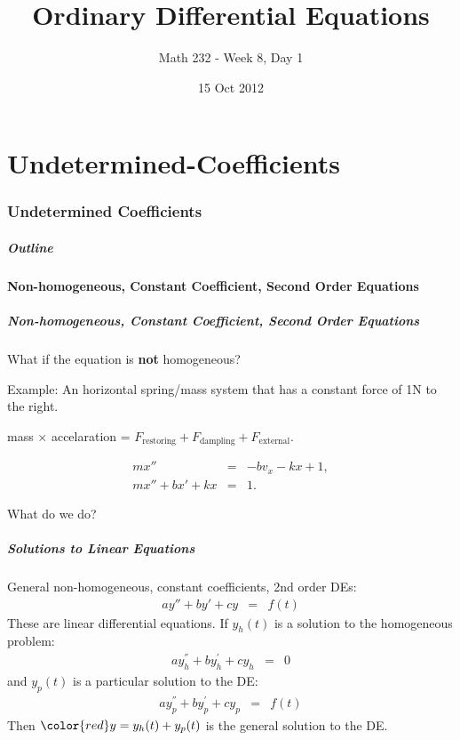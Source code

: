 \part{Undetermined-Coefficients}
\section{Undetermined Coefficients}

\title{Ordinary Differential Equations}
\subtitle{Math 232 - Week 8, Day 1}
\date{15 Oct 2012}

\begin{frame}
  \titlepage
\end{frame}

\begin{frame}
  \frametitle{Outline}
\end{frame}


\subsection{Non-homogeneous, Constant Coefficient, Second Order Equations}


\begin{frame}
  \frametitle{Non-homogeneous, Constant Coefficient, Second Order
    Equations}
  What if the equation is \textbf{not} homogeneous?

  Example: An horizontal spring/mass system that has a constant force
  of 1N to the right.
 
  \begin{center}
    mass $\times$ accelaration = $F_{\text{restoring}} + F_{\text{dampling}}
   + F_{\text{external}}.$ 
  \end{center}
  \begin{eqnarray*}
    m x'' & = & -b v_x - kx + 1, \\
    m x'' + bx' + kx & = & 1.
  \end{eqnarray*}

  What do we do?


\end{frame}


\begin{frame}
  \frametitle{Solutions to Linear Equations}
  General non-homogeneous, constant coefficients, 2nd order DEs:
  \begin{eqnarray*}
    ay'' + by' +cy & = & f(t) 
  \end{eqnarray*}  
  These are linear differential equations. If $y_h(t)$ is a solution
  to the homogeneous problem: 
  \begin{eqnarray*}
    ay^{''}_{h} + by^{'}_h +cy_h & = & 0
  \end{eqnarray*} 
  and $y_p(t)$ is a particular solution to the DE: 
  \begin{eqnarray*}
    ay^{''}_{p} + by^{'}_p +cy_p & = & f(t)
  \end{eqnarray*} 
  Then ${\color{red}y=y_h(t) + y_p(t)}$  is the general solution to the DE. 
\end{frame}


